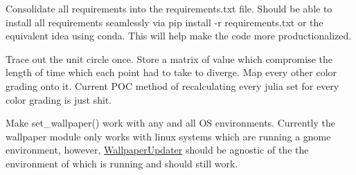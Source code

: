 \begin{DoxyRefList}
Consolidate all requirements into the requirements.\+txt file. Should be able to install all requirements seamlessly via pip install -\/r requirements.\+txt or the equivalent idea using conda. This will help make the code more productionalized. 

Trace out the unit circle once. Store a matrix of value which compromise the length of time which each point had to take to diverge. Map every other color grading onto it. Current P\+OC method of recalculating every julia set for every color grading is just shit.  
\item[Namespace \mbox{\hyperlink{namespaceWallpaperUpdater}{Wallpaper\+Updater}} ]\label{todo__todo000005}%
%
Make set\+\_\+wallpaper() work with any and all OS environments. Currently the wallpaper module only works with linux systems which are running a gnome environment, however, \mbox{\hyperlink{namespaceWallpaperUpdater}{Wallpaper\+Updater}} should be agnostic of the the environment of which is running and should still work. 
\end{DoxyRefList}